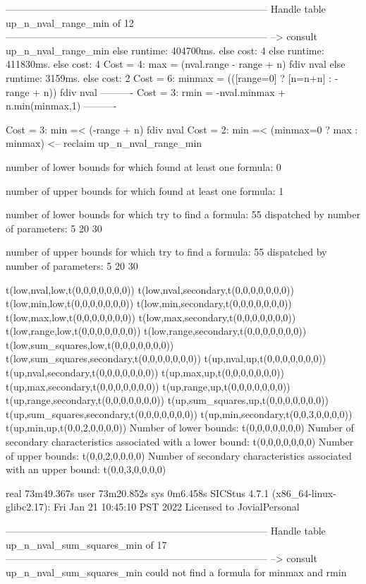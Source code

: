 --------------------------------------------------------------------------------
Handle table up_n_nval_range_min of 12
--------------------------------------------------------------------------------
--> consult up_n_nval_range_min
else runtime: 404700ms. else cost: 4
else runtime: 411830ms. else cost: 4
Cost =  4:  max    = (nval.range - range + n) fdiv nval %
else runtime: 3159ms. else cost: 2
Cost =  6:  minmax = (([range=0] ? [n=n+n] : -range + n)) fdiv nval %
----------
Cost =  3:  rmin   = -nval.minmax + n.min(minmax,1)
----------

Cost =  3:  min =< (-range + n) fdiv nval %
Cost =  2:  min =< (minmax=0 ? max : minmax)
<-- reclaim up_n_nval_range_min

number of lower bounds for which found at least one formula: 0

number of upper bounds for which found at least one formula: 1

number of lower bounds for which try to find a formula: 55
dispatched by number of parameters: 5  20  30

number of upper bounds for which try to find a formula: 55
dispatched by number of parameters: 5  20  30

t(low,nval,low,t(0,0,0,0,0,0,0))
t(low,nval,secondary,t(0,0,0,0,0,0,0))
t(low,min,low,t(0,0,0,0,0,0,0))
t(low,min,secondary,t(0,0,0,0,0,0,0))
t(low,max,low,t(0,0,0,0,0,0,0))
t(low,max,secondary,t(0,0,0,0,0,0,0))
t(low,range,low,t(0,0,0,0,0,0,0))
t(low,range,secondary,t(0,0,0,0,0,0,0))
t(low,sum_squares,low,t(0,0,0,0,0,0,0))
t(low,sum_squares,secondary,t(0,0,0,0,0,0,0))
t(up,nval,up,t(0,0,0,0,0,0,0))
t(up,nval,secondary,t(0,0,0,0,0,0,0))
t(up,max,up,t(0,0,0,0,0,0,0))
t(up,max,secondary,t(0,0,0,0,0,0,0))
t(up,range,up,t(0,0,0,0,0,0,0))
t(up,range,secondary,t(0,0,0,0,0,0,0))
t(up,sum_squares,up,t(0,0,0,0,0,0,0))
t(up,sum_squares,secondary,t(0,0,0,0,0,0,0))
t(up,min,secondary,t(0,0,3,0,0,0,0))
t(up,min,up,t(0,0,2,0,0,0,0))
Number of lower bounds:                                             t(0,0,0,0,0,0,0)
Number of secondary characteristics associated with a lower bound:  t(0,0,0,0,0,0,0)
Number of upper bounds:                                             t(0,0,2,0,0,0,0)
Number of secondary characteristics associated with an upper bound: t(0,0,3,0,0,0,0)

real	73m49.367s
user	73m20.852s
sys	0m6.458s
SICStus 4.7.1 (x86_64-linux-glibc2.17): Fri Jan 21 10:45:10 PST 2022
Licensed to JovialPersonal


--------------------------------------------------------------------------------
Handle table up_n_nval_sum_squares_min of 17
--------------------------------------------------------------------------------
--> consult up_n_nval_sum_squares_min
could not find a formula for minmax and rmin

